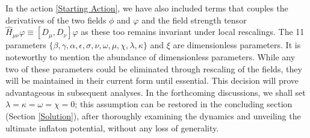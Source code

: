\documentclass[aps,prd,reprint,preprintnumbers,showpacs,floatfix,nofootinbib,superscript address]{revtex4-2}
\begin{document}
In the action \ref{Starting Action}, we have also included terms that couples the derivatives of the two fields $\phi$ and $\varphi$ and the field strength tensor $\hat{H}_{\mu\nu}\varphi \equiv [D_\mu,D_\nu]\varphi$ as these too remains invariant under local rescalings. The 11 parameters $\{\beta, \gamma, \alpha, \epsilon, \sigma, \nu, \omega, \mu, \chi ,\lambda, \kappa\}$ and $\xi$ are dimensionless parameters. It is noteworthy to mention the abundance of dimensionless parameters. While any two of these parameters could be eliminated through rescaling of the fields, they will be maintained in their current form until essential. This decision will prove advantageous in subsequent analyses. In the forthcoming discussions, we shall set $\lambda = \kappa = \omega = \chi= 0$; this assumption can be restored in the concluding section (Section \ref{Solution}), after thoroughly examining the dynamics and unveiling the ultimate inflaton potential, without any loss of generality.
\end{document}
